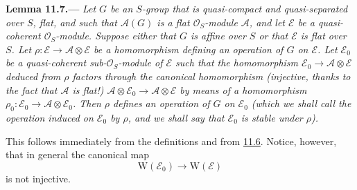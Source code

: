 \medskip
{}\label{lem:sga3-VIB-11.7}%
\noindent\textbf{Lemma 11.7.---}
\emph{Let \(G\) be an \(S\)-group that is quasi-compact and
quasi-separated over \(S\), flat, and such that
\(\mathcal A(G)\) is a flat \(\mathcal O_S\)-module
\(\mathcal A\), and let \(\mathcal E\) be a quasi-coherent
\(\mathcal O_S\)-module. Suppose either that \(G\) is affine
over \(S\) or that \(\mathcal E\) is flat over \(S\). Let
\(\rho:\mathcal E\to\mathcal A\otimes\mathcal E\) be a
homomorphism defining an operation of \(G\) on \(\mathcal E\).
Let \(\mathcal E_0\) be a quasi-coherent
sub-\(\mathcal O_S\)-module of \(\mathcal E\) such that the
homomorphism \(\mathcal E_0\to\mathcal A\otimes\mathcal E\)
deduced from \(\rho\) factors through the canonical
homomorphism \textup{(}injective, thanks to the fact that
\(\mathcal A\) is flat!\textup{)}
\(\mathcal A\otimes\mathcal E_0\to\mathcal A\otimes\mathcal E\)
by means of a homomorphism
\(\rho_0:\mathcal E_0\to\mathcal A\otimes\mathcal E_0\). Then
\(\rho\) defines an operation of \(G\) on \(\mathcal E_0\)
\textup{(}which we shall call the \emph{operation induced} on
\(\mathcal E_0\) by \(\rho\), and we shall say that
\(\mathcal E_0\) is \emph{stable} under \(\rho\)\textup{)}.}

This follows immediately from the definitions and from
\hyperref[par:sga3-VIB-11.6]{11.6}. Notice, however, that in
general the canonical map
\[
  \mathrm W(\mathcal E_0)\longrightarrow\mathrm W(\mathcal E)
\]
is not injective.
